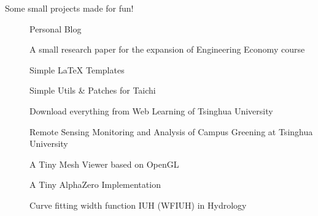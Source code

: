 

Some small projects made for fun!

\begin{description}
  \item[] Personal Blog
  \item[] A small research paper for the expansion of Engineering Economy course
  \item[] Simple \LaTeX{} Templates
  \item[] Simple Utils \& Patches for Taichi
  \item[] Download everything from Web Learning of Tsinghua University
  \item[] Remote Sensing Monitoring and Analysis of Campus Greening at Tsinghua University
  \item[] A Tiny Mesh Viewer based on OpenGL
  \item[] A Tiny AlphaZero Implementation
  \item[] Curve fitting width function IUH (WFIUH) in Hydrology
\end{description}
